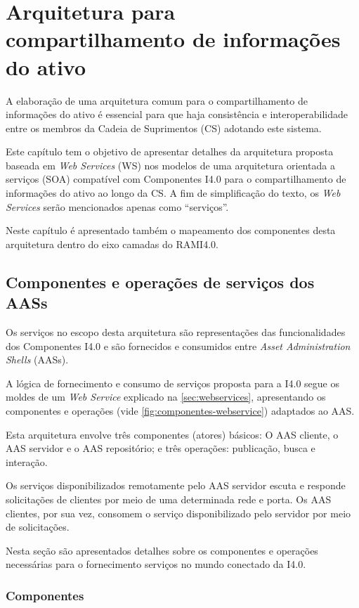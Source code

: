 \chapter{Arquitetura para compartilhamento de informações do ativo}
\label{cha:arquitetura}
	
	A elaboração de uma arquitetura comum para o compartilhamento de informações do ativo é essencial para que haja consistência e interoperabilidade entre os membros da Cadeia de Suprimentos (CS) adotando este sistema.
	
	Este capítulo tem o objetivo de apresentar detalhes da arquitetura proposta baseada em \textit{Web Services} (WS) nos modelos de uma arquitetura orientada a serviços (SOA) compatível com Componentes I4.0 para o compartilhamento de informações do ativo ao longo da CS. A fim de simplificação do texto, os \textit{Web Services} serão mencionados apenas como ``serviços''.
	
	Neste capítulo é apresentado também o mapeamento dos componentes desta arquitetura dentro do eixo camadas do RAMI4.0.
	
\section{Componentes e operações de serviços dos AASs}

	Os serviços no escopo desta arquitetura são representações das funcionalidades dos Componentes I4.0 e são fornecidos e consumidos entre \textit{Asset Administration Shells} (AASs).
	
	A lógica de fornecimento e consumo de serviços proposta para a I4.0 segue os moldes de um \textit{Web Service} explicado na \autoref{sec:webservices}, apresentando os componentes e operações (vide \autoref{fig:componentes-webservice}) adaptados ao AAS.
	
	Esta arquitetura envolve três componentes (atores) básicos: O AAS cliente, o AAS servidor e o AAS repositório; e três operações: publicação, busca e interação.

	Os serviços disponibilizados remotamente pelo AAS servidor escuta e responde solicitações de clientes por meio de uma determinada rede e porta. Os AAS clientes, por sua vez, consomem o serviço disponibilizado pelo servidor por meio de solicitações.
	
	Nesta seção são apresentados detalhes sobre os componentes e operações necessárias para o fornecimento serviços no mundo conectado da I4.0.
	
\subsection{Componentes}

